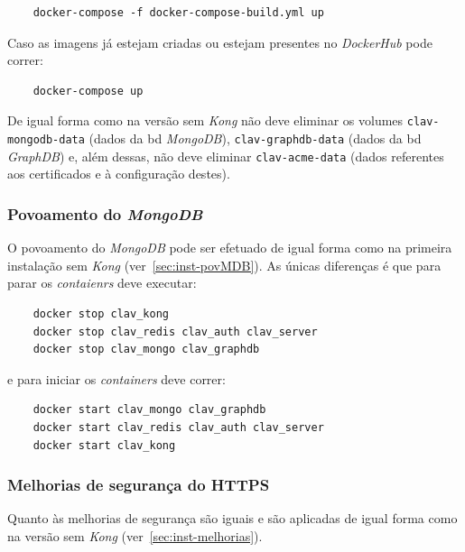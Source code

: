 \footnotesize
\begin{verbatim}
    docker-compose -f docker-compose-build.yml up
\end{verbatim}
\normalsize

Caso as imagens já estejam criadas ou estejam presentes no \textit{DockerHub} pode correr:

\footnotesize
\begin{verbatim}
    docker-compose up
\end{verbatim}
\normalsize

De igual forma como na versão sem \textit{Kong} não deve eliminar os volumes \texttt{clav-mongodb-data} (dados da \acrshort{bd} \textit{MongoDB}), \texttt{clav-graphdb-data} (dados da \acrshort{bd} \textit{GraphDB}) e, além dessas, não deve eliminar \texttt{clav-acme-data} (dados referentes aos certificados e à configuração destes).

\subsubsection{Povoamento do \textit{MongoDB}}

O povoamento do \textit{MongoDB} pode ser efetuado de igual forma como na primeira instalação sem \textit{Kong} (ver~\ref{sec:inst-povMDB}). As únicas diferenças é que para parar os \textit{contaienrs} deve executar:

\footnotesize
\begin{verbatim}
    docker stop clav_kong
    docker stop clav_redis clav_auth clav_server
    docker stop clav_mongo clav_graphdb
    \end{verbatim}
\normalsize
\vspace{-0.5cm}

e para iniciar os \textit{containers} deve correr:

\footnotesize
    \begin{verbatim}
    docker start clav_mongo clav_graphdb
    docker start clav_redis clav_auth clav_server
    docker start clav_kong
    \end{verbatim}
\normalsize
\vspace{-0.5cm}

\subsubsection{Melhorias de segurança do HTTPS}

Quanto às melhorias de segurança são iguais e são aplicadas de igual forma como na versão sem \textit{Kong} (ver~\ref{sec:inst-melhorias}).

